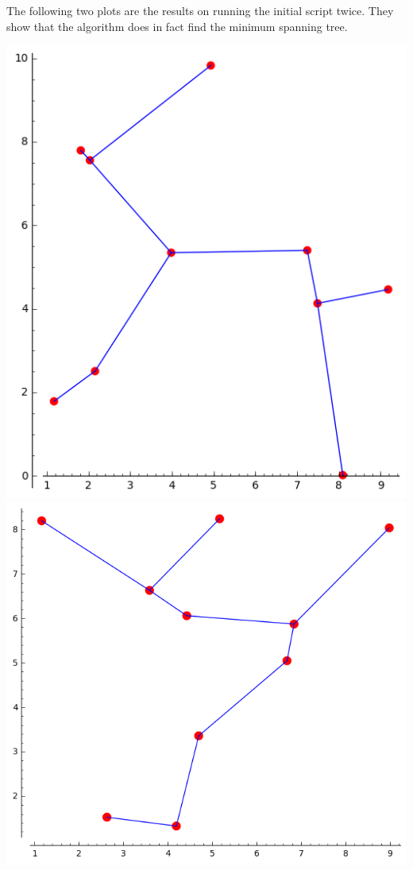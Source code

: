 \documentclass[11pt, oneside]{article}
\begin{document}
\begin{enumerate}
    The following two plots are the results on running the initial script twice.
    They show that the algorithm does in fact find the minimum spanning tree.
    \begin{center}
      \includegraphics[scale=.6]{Figures/midterm_1.png} \\
      \includegraphics[scale=.5]{Figures/midterm_2.png}
    \end{center}


\end{enumerate}
\end{document}
